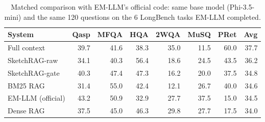 \begin{table}[t]
\centering
\caption{Matched comparison with EM-LLM's official code: same base model (Phi-3.5-mini) and the same 120 questions on the 6 LongBench tasks EM-LLM completed.}
\label{tab:emllm}
\setlength{\tabcolsep}{2.6pt}
\footnotesize
\begin{tabular}{lrrrrrrr}
\toprule
System & Qasp & MFQA & HQA & 2WQA & MuSQ & PRet & Avg \\
\midrule
Full context & 39.7 & 41.6 & 38.3 & 35.0 & 11.5 & 60.0 & 37.7 \\
SketchRAG-raw & 34.1 & 40.3 & 56.4 & 18.6 & 24.5 & 43.5 & 36.2 \\
SketchRAG-gate & 40.3 & 47.4 & 47.3 & 16.2 & 20.0 & 37.5 & 34.8 \\
BM25 RAG & 31.4 & 55.0 & 42.4 & 12.1 & 26.7 & 40.0 & 34.6 \\
EM-LLM (official) & 43.2 & 50.9 & 32.9 & 27.7 & 37.5 & 15.0 & 34.5 \\
Dense RAG & 37.5 & 45.0 & 46.3 & 29.8 & 27.7 & 17.5 & 34.0 \\
\bottomrule
\end{tabular}
\end{table}